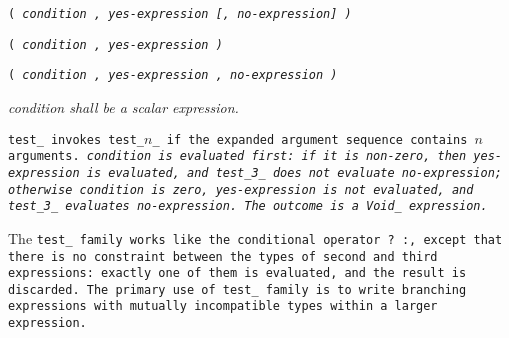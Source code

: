 
\s\s\s\tt{(} \it{condition} \tt{,} \it{yes-expression}
[\tt{,} \it{no-expression}] \tt{)}

\s\tt{(} \it{condition} \tt{,} \it{yes-expression} \tt{)}

\s\tt{(} \it{condition} \tt{,} \it{yes-expression}
\phantom{[}\tt{,} \it{no-expression}\phantom{]} \tt{)}


\it{condition} shall be a scalar expression.


\tt{test_} invokes \tt{test_}$n$\_ if the
expanded argument sequence contains $n$ arguments.
\it{condition} is evaluated first: if it is non-zero,
then \it{yes-expression} is evaluated,
and \tt{test_3_} does not evaluate \it{no-expression};
otherwise \it{condition} is zero, \it{yes-expression}
is not evaluated, and \tt{test_3_} evaluates \it{no-expression}.
The outcome is a \tt{Void_} expression.

\note The \tt{test_} family works like the conditional operator \tt{? :}, except
that there is no constraint between the types of second and third expressions:
exactly one of them is evaluated, and the result is discarded.
The primary use of \tt{test_} family is to write branching expressions
with mutually incompatible types within a larger expression.
